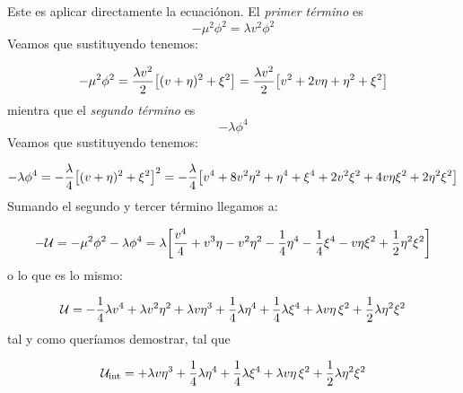 Este es aplicar directamente la ecuaciónon. El \textit{primer término} es 
\begin{equation}
- \mu^2 \phi^2 =  \lambda v^2 \phi^2
\end{equation}
Veamos que sustituyendo tenemos: 

\begin{equation}
	- \mu^2 \phi^2 = \frac{\lambda v^2}{2} \bqty{(v + \eta)^2 + \xi^2} =
	\frac{\lambda v^2}{2} \bqty{v^2 + 2v\eta + \eta^2 + \xi^2}  
\end{equation}
mientra que el \textit{segundo término} es 
\begin{equation}
	-\lambda \phi^4 
\end{equation}
Veamos que sustituyendo tenemos: 

\begin{equation}
	-\lambda \phi^4  = -\frac{\lambda}{4} \bqty{(v + \eta)^2 + \xi^2}^2 = -
		\frac{\lambda}{4} \bqty{v^4 + 8v^2\eta^2 + \eta^4 + \xi^4 + 2 v^2 \xi^2 + 4 v \eta \xi^2 + 2 \eta^2 \xi^2}  
\end{equation}
Sumando el segundo y tercer término llegamos a: 

\begin{equation}
	- \Ucal = - \mu^2 \phi^2 -\lambda \phi^4  = \lambda\bqty{\frac{v^4}{4}+ v^3 \eta - {v^2 \eta^2} -   \frac{1}{4}  \eta^4 -  \frac{1}{4} \xi^4 -   v \eta \xi^2 +  \frac{1}{2}  \eta^2 \xi^2 }
\end{equation}
o lo que es lo mismo: 

\begin{equation}
	\mathcal{U} = -\frac{1}{4}\lambda v^4 + \lambda v^2\eta^2 + \lambda v\eta^3 + \frac{1}{4}\lambda\eta^4
+ \frac{1}{4}\lambda\xi^4 + \lambda v\eta\,\xi^2 + \frac{1}{2}\lambda \eta^2\xi^2
\end{equation}
tal y como queríamos demostrar, tal que 

\begin{equation}
	\mathcal{U}_{\text{int}} = + \lambda v\eta^3 + \frac{1}{4}\lambda\eta^4
+ \frac{1}{4}\lambda\xi^4 + \lambda v\eta\,\xi^2 + \frac{1}{2}\lambda \eta^2\xi^2
\end{equation}
		

